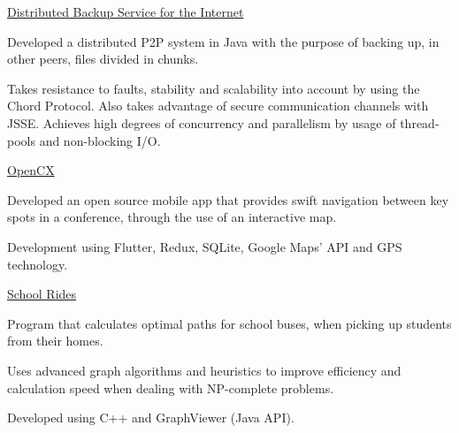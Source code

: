 
\begin{cventries}

  \cventry
  {} %
  {\href{https://github.com/MiguelDelPinto/distributed-backup-service/tree/master/proj2}{Distributed Backup Service for the Internet}} %
  {} %
  {} %
  {
    \begin{cvitems} %
      \item {Developed a distributed P2P system in Java with the purpose of backing up, in other peers, files divided in chunks.}
      \item {Takes resistance to faults, stability and scalability into account by using the Chord Protocol. Also takes advantage of secure communication channels with JSSE. Achieves high degrees of concurrency and parallelism by usage of thread-pools and non-blocking I/O.}
    \end{cvitems}
  }

  \cventry
    {} %
    {\href{https://github.com/softeng-feup/open-cx}{OpenCX}} %
    {} %
    {} %
    {
      \begin{cvitems} %
      	\item {Developed an open source mobile app that provides swift navigation between key spots in a conference, through the use of an interactive map.}
		    \item {Development using Flutter, Redux, SQLite, Google Maps' API and GPS technology.}
      \end{cvitems}
    }

  \cventry
    {} %
    {\href{https://github.com/MiguelDelPinto/school-rides}{School Rides}} %
    {} %
    {} %
    {
      \begin{cvitems} %
      	\item {Program that calculates optimal paths for school buses, when picking up students from their homes.}
		    \item {Uses advanced graph algorithms and heuristics to improve efficiency and calculation speed when dealing with NP-complete problems.}
		    \item {Developed using C++ and GraphViewer (Java API).}
      \end{cvitems}
    }

   
\end{cventries}